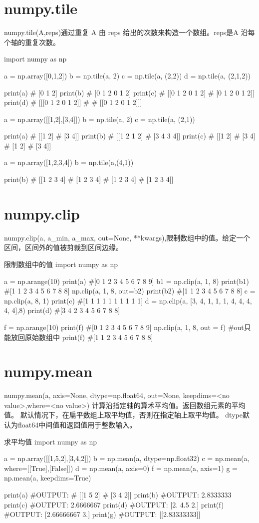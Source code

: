 \documentclass[11pt]{article}
\begin{document}
\section{numpy.tile}
numpy.tile(A,reps)通过重复 A 由 reps 给出的次数来构造一个数组。reps是A 沿每个轴的重复次数。
\begin{Python}
	import numpy as np
	
	a = np.array([0,1,2])
	b = np.tile(a, 2)
	c = np.tile(a, (2,2))
	d = np.tile(a, (2,1,2))
	
	print(a)
	#   [0 1 2]
	print(b)
	#   [0 1 2 0 1 2]
	print(c)
	#   [[0 1 2 0 1 2]
	#    [0 1 2 0 1 2]]
	print(d)
	#   [[[0 1 2 0 1 2]]
	#
	#    [[0 1 2 0 1 2]]]
	
	a = np.array([[1,2],[3,4]])
	b = np.tile(a, 2)
	c = np.tile(a, (2,1))
	
	print(a)
	#       [[1 2]
	#        [3 4]]
	print(b)
	#       [[1 2 1 2]
	#        [3 4 3 4]]
	print(c)
	#       [[1 2]
	#        [3 4]
	#        [1 2]
	#        [3 4]]
	
	a = np.array([1,2,3,4])
	b = np.tile(a,(4,1))
	
	print(b)
	#       [[1 2 3 4]
	#        [1 2 3 4]
	#        [1 2 3 4]
	#        [1 2 3 4]]
\end{Python}
\section{numpy.clip}
numpy.clip(a, a\_min, a\_max, out=None, **kwargs),限制数组中的值。给定一个区间，区间外的值被剪裁到区间边缘。
\begin{Python}{限制数组中的值}
import numpy as np

a = np.arange(10)
print(a)
#[0 1 2 3 4 5 6 7 8 9]
b1 = np.clip(a, 1, 8)
print(b1)
#[1 1 2 3 4 5 6 7 8 8]
np.clip(a, 1, 8, out=b2)
print(b2)
#[1 1 2 3 4 5 6 7 8 8]
c = np.clip(a, 8, 1)
print(c)
#[1 1 1 1 1 1 1 1 1 1]
d = np.clip(a, [3, 4, 1, 1, 1, 4, 4, 4, 4, 4],8)
print(d)
#[3 4 2 3 4 5 6 7 8 8]



f = np.arange(10)
print(f)
#[0 1 2 3 4 5 6 7 8 9]
np.clip(a, 1, 8, out = f)	#out只能放回原始数组中
print(f)
#[1 1 2 3 4 5 6 7 8 8]
\end{Python}
\section{numpy.mean}
numpy.mean(a, axis=None, dtype=np.float64, out=None, keepdims=<no value>,where=<no value>)
计算沿指定轴的算术平均值。返回数组元素的平均值。
默认情况下，在扁平数组上取平均值，否则在指定轴上取平均值。 
dtype默认为float64中间值和返回值用于整数输入。
\begin{Python}{求平均值}
import numpy as np

a = np.array([[1,5,2],[3,4,2]])
b = np.mean(a, dtype=np.float32)
c = np.mean(a, where=[[True],[False]])
d = np.mean(a, axis=0)
f = np.mean(a, axis=1)
g = np.mean(a, keepdims=True)

print(a)
#OUTPUT:
#       [[1 5 2]
#        [3 4 2]]
print(b)
#OUTPUT: 2.8333333
print(c)
#OUTPUT: 2.6666667
print(d)
#OUTPUT: [2. 4.5 2.]
print(f)
#OUTPUT: [2.66666667 3.]
print(g)
#OUTPUT: [[2.83333333]]
\end{Python}
\end{document}
